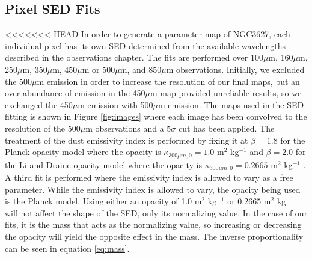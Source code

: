 \subsection{Pixel SED Fits}

<<<<<<< HEAD
In order to generate a parameter map of NGC3627, each individual pixel has its own SED determined from the available wavelengths described in the observations chapter.  The fits are performed over 100$\mu$m, 160$\mu$m, 250$\mu$m, 350$\mu$m, 450$\mu$m or 500$\mu$m, and 850$\mu$m observations.  Initially, we excluded the 500$\mu$m emission in order to increase the resolution of our final maps, but an over abundance of emission in the 450$\mu$m map provided unreliable results, so we exchanged the 450$\mu$m emission with 500$\mu$m emission.  The maps used in the SED fitting is shown in Figure \ref{fig:images} where each image has been convolved to the resolution of the 500$\mu$m observations and a 5$\sigma$ cut has been applied.  The treatment of the dust emissivity index is performed by fixing it at $\beta=1.8$ for the Planck opacity model where the opacity is $\kappa_{300\mu m,0}=1.0$ m$^2$ kg$^{-1}$ \citep{planckxxv2011} and $\beta=2.0$ for the Li and Draine opacity model where the opacity is $\kappa_{300\mu m,0}=0.2665$ m$^2$ kg$^{-1}$ \citep{li2001}.  A third fit is performed where the emissivity index is allowed to vary as a free parameter.  While the emissivity index is allowed to vary, the opacity being used is the Planck model.  Using either an opacity of 1.0 m$^2$ kg$^{-1}$ or 0.2665 m$^2$ kg$^{-1}$ will not affect the shape of the SED, only its normalizing value.  In the case of our fits, it is the mass that acts as the normalizing value, so increasing or decreasing the opacity will yield the opposite effect in the mass.  The inverse proportionality can be seen in equation \ref{eq:mass}.  

